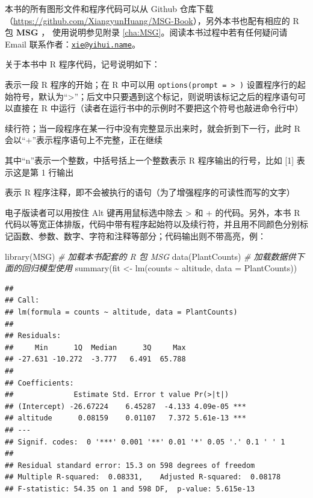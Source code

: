 \documentclass[
  b5paper,
  UTF8,twoside]{book}
\newenvironment{Shaded}{\begin{snugshade}}{\end{snugshade}}
\newcommand{\AttributeTok}[1]{\textcolor[rgb]{0.77,0.63,0.00}{#1}}
\newcommand{\CommentTok}[1]{\textcolor[rgb]{0.56,0.35,0.01}{\textit{#1}}}
\newcommand{\FunctionTok}[1]{\textcolor[rgb]{0.00,0.00,0.00}{#1}}
\newcommand{\NormalTok}[1]{#1}
\newcommand{\OtherTok}[1]{\textcolor[rgb]{0.56,0.35,0.01}{#1}}
\newcommand{\SpecialCharTok}[1]{\textcolor[rgb]{0.00,0.00,0.00}{#1}}
\providecommand{\tightlist}{%
  \setlength{\itemsep}{0pt}\setlength{\parskip}{0pt}}
\begin{document}
本书的所有图形文件和程序代码可以从 Github 仓库下载（\url{https://github.com/XiangyunHuang/MSG-Book}），另外本书也配有相应的 R 包 \textbf{MSG} \citep{MSG}， 使用说明参见附录 \ref{cha:MSG}。阅读本书过程中若有任何疑问请 Email 联系作者：\href{mailto:xie@yihui.name}{\nolinkurl{xie@yihui.name}}。

关于本书中 R 程序代码，记号说明如下：

\begin{description}
\tightlist
\item[\texttt{\textgreater{}}]
表示一段 R 程序的开始；在 R 中可以用 \texttt{options(prompt\ =\ \textquotesingle{}\textgreater{}\ \textquotesingle{})} 设置程序行的起始符号，默认为``\textgreater{}''；后文中只要遇到这个标记，则说明该标记之后的程序语句可以直接在 R 中运行（读者在运行书中的示例时不要把这个符号也敲进命令行中）
\item[\texttt{+}]
续行符；当一段程序在某一行中没有完整显示出来时，就会折到下一行，此时 R 会以``+''表示程序语句上不完整，正在继续
\item[\texttt{{[}n{]}}]
其中``n''表示一个整数，中括号括上一个整数表示 R 程序输出的行号，比如 {[}1{]} 表示这是第 1 行输出
\item[\texttt{\#}]
表示 R 程序注释，即不会被执行的语句（为了增强程序的可读性而写的文字）
\end{description}

电子版读者可以用按住 Alt 键再用鼠标选中除去 \textgreater{} 和 + 的代码。另外，本书 R 代码以等宽正体排版，代码中带有程序起始符以及续行符，并且用不同颜色分别标记函数、参数、数字、字符和注释等部分；代码输出则不带高亮，例：

\begin{Shaded}
\begin{Highlighting}[]
\FunctionTok{library}\NormalTok{(MSG) }\CommentTok{\# 加载本书配套的 R 包 MSG}
\FunctionTok{data}\NormalTok{(PlantCounts) }\CommentTok{\# 加载数据供下面的回归模型使用}
\FunctionTok{summary}\NormalTok{(fit }\OtherTok{\textless{}{-}} \FunctionTok{lm}\NormalTok{(counts }\SpecialCharTok{\textasciitilde{}}\NormalTok{ altitude, }\AttributeTok{data =}\NormalTok{ PlantCounts))}
\end{Highlighting}
\end{Shaded}

\begin{verbatim}
## 
## Call:
## lm(formula = counts ~ altitude, data = PlantCounts)
## 
## Residuals:
##     Min      1Q  Median      3Q     Max 
## -27.631 -10.272  -3.777   6.491  65.788 
## 
## Coefficients:
##              Estimate Std. Error t value Pr(>|t|)    
## (Intercept) -26.67224    6.45287  -4.133 4.09e-05 ***
## altitude      0.08159    0.01107   7.372 5.61e-13 ***
## ---
## Signif. codes:  0 '***' 0.001 '**' 0.01 '*' 0.05 '.' 0.1 ' ' 1
## 
## Residual standard error: 15.3 on 598 degrees of freedom
## Multiple R-squared:  0.08331,    Adjusted R-squared:  0.08178 
## F-statistic: 54.35 on 1 and 598 DF,  p-value: 5.615e-13
\end{verbatim}
\end{document}
